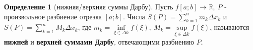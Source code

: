 \documentclass{report}
\theoremstyle{definition}
\newtheorem*{definition}{Определение}
\begin{document}
\begin{definition}[нижняя/верхняя суммы Дарбу]
    Пусть $f[a;b] \rightarrow \mathbb{R}, \ P$ - произвольное разбиение отрезка $[a;b]$. Числа
    $\underline{S}(P) = \sum_{k=1}^{n}m_{k}\Delta x_{k}$ и $\overline{S}(P) = \sum_{k=1}^{n}M_{k}
        \Delta x_{k}$, где $m_{k} = \underset{\xi \in \Delta k}{\inf}f(\xi), \ M_{k} = \underset{\xi\in\Delta k}
        {\sup}f(\xi)$, называются \textbf{нижней} и \textbf{верхней суммами Дарбу}, отвечающими разбиению $P$.

    \begin{figure}[h]
        \begin{minipage}[h]{0.49\linewidth}
        \end{minipage}
        \hfill
        \begin{minipage}[h]{0.49\linewidth}
        \end{minipage}
    \end{figure}
\end{definition}
\end{document}
